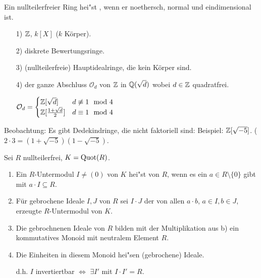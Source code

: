 \documentclass[a4paper, 10pt]{report}
\begin{document}
\begin{Def}

Ein nullteilerfreier Ring hei"st , wenn er noethersch, normal und eindimensional ist.

\begin{nnBsp}
\begin{enumerate}
\item[1)] $\mathbb{Z}$, $k[X]$ ($k$ K\"orper).

\item[2)] diskrete Bewertungsringe.

\item[3)] (nullteilerfreie) Hauptidealringe, die kein Körper sind.

\item[4)] der ganze Abschluss $\mathcal{O}_d$ von $\mathbb{Z}$ in $\mathbb{Q}(\sqrt{d})$ wobei $d \in \mathbb{Z}$ quadratfrei.

$\mathcal{O}_d = \begin{cases}
\mathbb{Z}[\sqrt{d}] & d \not\equiv 1 \mod 4\\
\mathbb{Z}[\frac{1+\sqrt{d}}{2}] & d \equiv 1 \mod 4
\end{cases}$

\end{enumerate}
\end{nnBsp}

\end{Def}

Beobachtung: Es gibt Dedekindringe, die nicht faktoriell sind: Beispiel:
$\mathbb{Z}[\sqrt{-5}]$. ($2 \cdot 3 = (1 + \sqrt{-5}) (1 - \sqrt{-5})$.

\begin{DefBem}
Sei $R$ nullteilerfrei, $K = \Quot{R}$.
\begin{enumerate}
\item Ein $R$-Untermodul $I \neq (0)$ von $K$ hei"st  von $R$, wenn es ein $a \in R \setminus \{0\}$ gibt mit $a \cdot I \subseteq R$.

\item F\"ur gebrochene Ideale $I,J$ von $R$ sei $I \cdot J$ der von allen $a \cdot b$, $a \in I, b \in J$, erzeugte $R$-Untermodul von $K$.

\item Die gebrochnenen Ideale von $R$ bilden mit der Multiplikation aus b) ein kommutatives Monoid mit neutralem Element $R$.

\item Die Einheiten in diesem Monoid hei"sen  (gebrochene) Ideale.

d.h. $I$ invertiertbar $\Leftrightarrow$ $\exists I'$ mit $I \cdot I' = R$.

\end{enumerate}
\end{DefBem}
\end{document}
